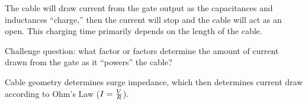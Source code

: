





The cable will draw current from the gate output as the capacitances and inductances ``charge,'' then the current will stop and the cable will act as an open.  This charging time primarily depends on the length of the cable.

\vskip 10pt

Challenge question: what factor or factors determine the amount of current drawn from the gate as it ``powers'' the cable?







Cable geometry determines surge impedance, which then determines current draw according to Ohm's Law ($I = {V \over R}$).




